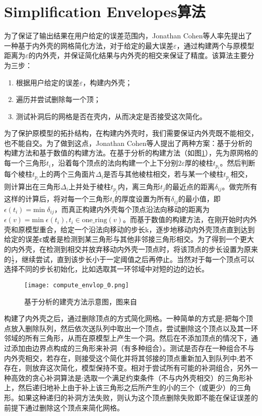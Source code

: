\section{Simplification Envelopes算法}
为了保证了输出结果在用户给定的误差范围内，Jonathan Cohen等人率先提出了一种基于内外壳的网格简化方法\cite{simp-envlop}，对于给定的最大误差$\varepsilon$，通过构建两个与原模型距离为$\varepsilon$的内外壳，并保证简化结果与内外壳的相交来保证了精度。该算法主要分为三步：
\begin{enumerate}[（1）]
  \item 根据用户给定的误差$\varepsilon$，构建内外壳；
  \item 遍历并尝试删除每一个顶；
  \item 测试补洞后的网格是否在壳内，从而决定是否接受这次简化。
\end{enumerate}
\par 为了保护原模型的拓扑结构，在构建内外壳时，我们需要保证内外壳既不能相交，也不能自交。为了做到这点，Jonathan Cohen等人提出了两种方案：基于分析的构建方法和基于数值的构建方法。在基于分析的构建方法（如图\ref{fig:compute-envlop0}），先为原网格的每一个三角形$t_i$，沿着每个顶点的法向构建一个上下分别$2\varepsilon$厚的棱柱$t_{p_i}$。然后判断每个棱柱$t_{p_i}$上的两个三角面片$\Delta_i$是否与其他棱柱相交，若与某一个棱柱$t_{p_j}$相交，则计算出在三角形$\Delta_i$上并处于棱柱$t_{p_j}$内，离三角形$t_j$的最近点的距离$\delta_{ij}$。做完所有这样的计算后，将对每一个三角形$t_i$的厚度设置为所有$\delta_{ij}$的最小值，即$\epsilon(t_i) = \text{min} \; \delta_{ij}$，而真正构建内外壳每个顶点沿法向移动的距离为$\epsilon(v) = \text{min} \; \epsilon(t_i),t_i \in \text{one\_ring}(v)$。而基于数值的构建方法，在刚开始时内外壳和原模型重合，给定一个沿法向移动的步长k，逐步地移动内外壳顶点直到达到给定的误差ε或者是检测到某三角形与其他非邻接三角形相交。为了得到一个更大的内外壳，在检测到相交并放弃移动内外壳一顶点时，将该顶点的步长设置为原来的$\frac{1}{2}$，继续尝试，直到该步长小于一定阈值之后再停止。当然对于每一个顶点可以选择不同的步长初始化，比如选取其一环邻域中对短的边的边长。\par
\begin{figure}[htbp]
    \centering
    \texttt{[image: compute\_envlop\_0.png]}
    \caption[分析建壳方法]{基于分析的建壳方法示意图，图来自\cite{simp-envlop}}
    \label{fig:compute-envlop0}
\end{figure}
构建了内外壳之后，通过删除顶点的方式简化网格。一种简单的方式是:把每个顶点放入删除队列，然后依次送队列中取出一个顶点，尝试删除这个顶点以及其一环邻域的所有三角形，从而在原模型上产生一个洞。然后在不添加顶点的情况下，通过添加由边界点构成的三角形来补洞（有多种组合）。测试是否存在一种组合不与内外壳相交，若存在，则接受这个简化并将其邻接的顶点重新加入到队列中;若不存在，则放弃这次简化，模型保持不变。相对于尝试所有可能的补洞组合，另外一种高效的贪心补洞算法是:选取一个满足约束条件（不与内外壳相交）的三角形补上，然后递归地补上由于补上该三角形之后所产生的小的三个（或更少）的三角形。如果这种递归的补洞方法失败，则认为这个顶点删除失败即不能在保证误差的前提下通过删除这个顶点来简化网格。\par
